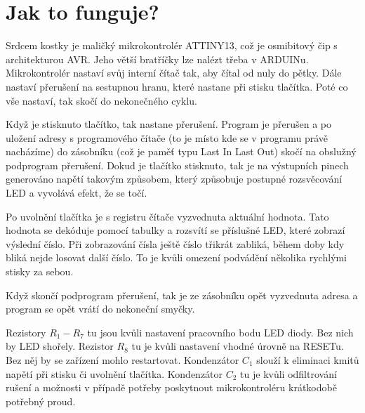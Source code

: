 \section*{Jak to funguje?}

Srdcem kostky je maličký mikrokontrolér ATTINY13, což je osmibitový čip s architekturou AVR. Jeho větší bratříčky lze nalézt třeba v ARDUINu. Mikrokontrolér nastaví svůj interní čítač tak, aby čítal od nuly do pětky. Dále nastaví přerušení na sestupnou hranu, které nastane při stisku tlačítka. Poté co vše nastaví, tak skočí do nekonečného cyklu.

Když je stisknuto tlačítko, tak nastane přerušení. Program je přerušen a po uložení adresy s programového čítače (to je místo kde se v programu právě nacházíme) do zásobníku (což je paměť typu Last In Last Out) skočí na obslužný podprogram přerušení. Dokud je tlačítko stisknuto, tak je na výstupních pinech generováno napětí takovým způsobem, který způsobuje postupné rozsvěcování LED a vyvolává efekt, že se točí.

Po uvolnění tlačítka je s registru čítače vyzvednuta aktuální hodnota. Tato hodnota se dekóduje pomocí tabulky a rozsvítí se příslušné LED, které zobrazí výslední číslo. Při zobrazování čísla ještě číslo třikrát zabliká, během doby kdy bliká nejde losovat další číslo. To je kvůli omezení podvádění několika rychlými stisky za sebou.

Když skončí podprogram přerušení, tak je ze zásobníku opět vyzvednuta adresa a program se opět vrátí do nekoneční smyčky.

Rezistory $R_1 - R_7$ tu jsou kvůli nastavení pracovního bodu LED diody. Bez nich by LED shořely. Rezistor $R_8$ tu je kvůli nastavení vhodné úrovně na RESETu. Bez něj by se zařízení mohlo restartovat. Kondenzátor $C_1$ slouží k eliminaci kmitů napětí při stisku či uvolnění tlačítka. Kondenzátor $C_2$ tu je kvůli odfiltrování rušení a možnosti v případě potřeby poskytnout mikrokontroléru krátkodobě potřebný proud.